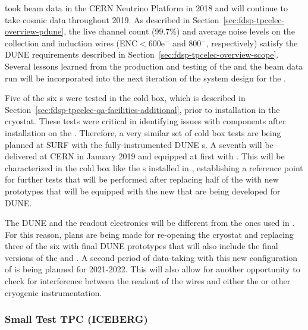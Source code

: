  took beam data in the CERN Neutrino Platform in 2018 and will continue
to take cosmic data throughout 2019. As described in Section~\ref{sec:fdsp-tpcelec-overview-pdune}, 
the live channel count (99.7\%) and average noise levels on the collection and induction wires 
(ENC$<$600e$^-$ and 800$^-$, respectively) satisfy the DUNE \single requirements described 
in Section~\ref{sec:fdsp-tpcelec-overview-scope}. Several lessons learned from the production 
and testing of the  and the beam data run will be incorporated into the 
next iteration of the system design for the .


Five of the six s were tested in the  cold box, which is described in
Section~\ref{sec:fdsp-tpcelec-qa-facilities-additional}, prior to installation in the cryostat. 
These tests were critical in identifying issues with  components after installation 
on the . Therefore, a very similar set of cold box tests are being planned at SURF 
with the fully-instrumented DUNE s. A seventh  will be delivered
at CERN in January 2019 and equipped at first with  . This
 will be characterized in the cold box like the s installed
in , establishing a reference point for further tests that will be
performed after replacing half of the  with new prototypes that will 
be equipped with the new  that are being developed for DUNE. 

The DUNE  and the readout electronics will be different from the ones used 
in . For this reason, plans are being made for re-opening the  cryostat 
and replacing three of the six  with final DUNE prototypes that will also include 
the final versions of the  and . A second period of data-taking 
with this new configuration of  is being planned for 2021-2022. This will also 
allow for another opportunity to check for interference between the readout of the  
wires and either the  or other cryogenic instrumentation.

\subsubsection{Small Test TPC (ICEBERG)}
\label{sec:fdsp-tpcelec-qa-facilities-testtpc}

